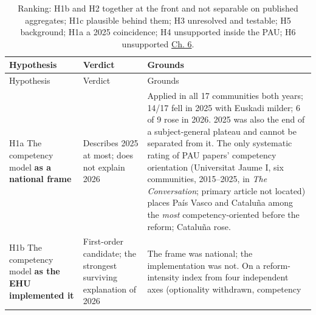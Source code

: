 \documentclass[
  10.5pt,
  a4paper,
  DIV=11,
  numbers=noendperiod]{scrartcl}
\begin{document}
\begin{longtable}[]{@{}
  >{\raggedright\arraybackslash}p{}
  >{\raggedright\arraybackslash}p{}
  >{\raggedright\arraybackslash}p{}@{}}
\caption{Ranking: H1b and H2 together at the front and not separable on
published aggregates; H1c plausible behind them; H3 unresolved and
testable; H5 background; H1a a 2025 coincidence; H4 unsupported inside
the PAU; H6 unsupported \href{06-interpretation.qmd}{Ch.
6}.}\label{tbl-b-hyp}\tabularnewline
\toprule\noalign{}
\begin{minipage}[b]{\linewidth}\raggedright
Hypothesis
\end{minipage} & \begin{minipage}[b]{\linewidth}\raggedright
Verdict
\end{minipage} & \begin{minipage}[b]{\linewidth}\raggedright
Grounds
\end{minipage} \\
\midrule\noalign{}
\endfirsthead
\toprule\noalign{}
\begin{minipage}[b]{\linewidth}\raggedright
Hypothesis
\end{minipage} & \begin{minipage}[b]{\linewidth}\raggedright
Verdict
\end{minipage} & \begin{minipage}[b]{\linewidth}\raggedright
Grounds
\end{minipage} \\
\midrule\noalign{}
\endhead
\bottomrule\noalign{}
\endlastfoot
H1a The competency model \textbf{as a national frame} & Describes 2025
at most; does not explain 2026 & Applied in all 17 communities both
years; 14/17 fell in 2025 with Euskadi milder; 6 of 9 rose in 2026. 2025
was also the end of a subject-general plateau and cannot be separated
from it. The only systematic rating of PAU papers' competency
orientation (Universitat Jaume I, six communities, 2015--2025, in
\emph{The Conversation}; primary article not located) places País Vasco
and Cataluña among the \emph{most} competency-oriented before the
reform; Cataluña rose. \\
H1b The competency model \textbf{as the EHU implemented it} &
First-order candidate; the strongest surviving explanation of 2026 & The
frame was national; the implementation was not. On a reform-intensity
index from four independent axes (optionality withdrawn, competency

\end{longtable}
\end{document}
